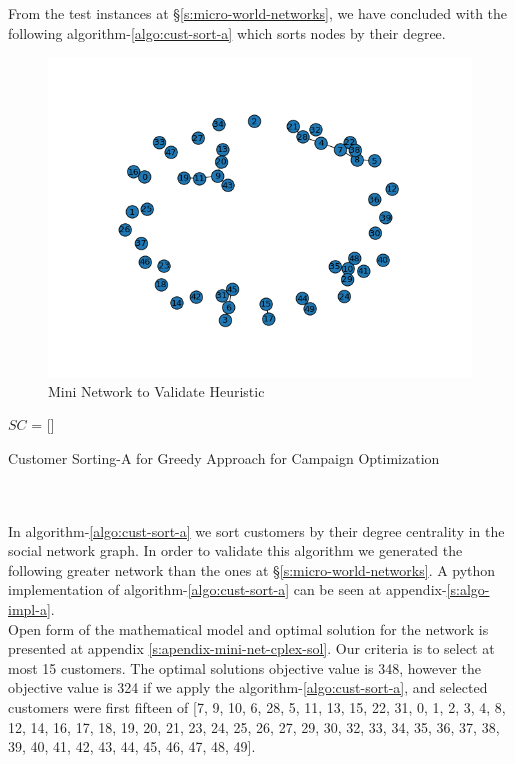 \documentclass[11pt]{article}
\begin{document}
From the test instances at \S \ref{s:micro-world-networks}, we have concluded with the following algorithm-\ref{algo:cust-sort-a} which sorts nodes by their degree.

\begin{figure}[h!]
    \centering
    \includegraphics[width=12cm]{mini_world_case.png}
    \caption{Mini Network to Validate Heuristic}
    \label{fig:fig_mini_world_case}
\end{figure}

\begin{algorithm}[H]
\DontPrintSemicolon
{}
$SC$ = []\;
\;
\caption{Customer Sorting-A for Greedy Approach for Campaign Optimization}
\label{algo:cust-sort-a}
\end{algorithm}
\\
\hbox{}
\\
In algorithm-\ref{algo:cust-sort-a} we sort customers by their degree centrality in the social network graph. In order to validate this algorithm we generated the following greater network than the ones at \S \ref{s:micro-world-networks}. A python implementation of algorithm-\ref{algo:cust-sort-a} can be seen at appendix-\ref{s:algo-impl-a}.\\

Open form of the mathematical model and optimal solution for the network is presented at appendix \ref{s:apendix-mini-net-cplex-sol}. Our criteria is to select at most 15 customers. The optimal solutions objective value is 348, however the objective value is 324 if we apply the algorithm-\ref{algo:cust-sort-a}, and selected customers were first fifteen of [7, 9, 10, 6, 28, 5, 11, 13, 15, 22, 31, 0, 1, 2, 3, 4, 8, 12, 14, 16, 17, 18, 19, 20, 21, 23, 24, 25, 26, 27, 29, 30, 32, 33, 34, 35, 36, 37, 38, 39, 40, 41, 42, 43, 44, 45, 46, 47, 48, 49]. \\
\end{document}
